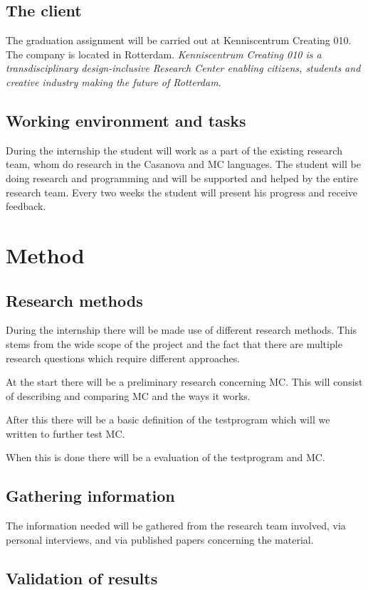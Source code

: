 \section{The client}
The graduation assignment will be carried out at Kenniscentrum Creating 010.
The company is located in Rotterdam.
\textit{Kenniscentrum Creating 010 is a transdisciplinary design-inclusive Research Center enabling citizens, students and creative industry making the future of Rotterdam}\cite{creating2016home}.

\section{Working environment and tasks}
During the internship the student will work as a part of the existing research team, whom do research in the Casanova and MC languages.
The student will be doing research and programming and will be supported and helped by the entire research team.
Every two weeks the student will present his progress and receive feedback.


\chapter{Method}
\section{Research methods}
During the internship there will be made use of different research methods.
This stems from the wide scope of the project and the fact that there are multiple research questions which require different approaches.

At the start there will be a preliminary research concerning MC.
This will consist of describing and comparing MC and the ways it works.

After this there will be a basic definition of the testprogram which will we written to further test MC.

When this is done there will be a evaluation of the testprogram and MC.

\section{Gathering information}
The information needed will be gathered from the research team involved, via personal interviews, and via published papers concerning the material.

\section{Validation of results}

